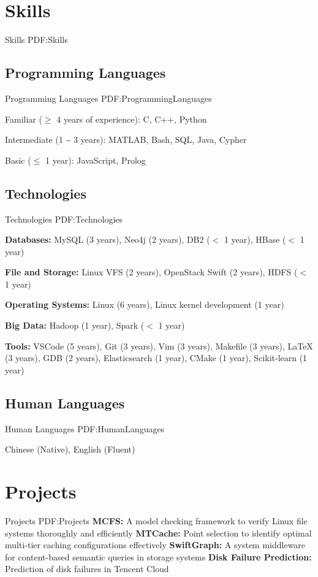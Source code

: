 \documentclass[letterpaper,10pt,oneside]{article}
\begin{document}
\begin{body}

\section
{Skills}
{Skills}
{PDF:Skills}

\subsection
{Programming Languages}
{Programming Languages}
{PDF:ProgrammingLanguages}

\BulletItem
Familiar ($\geq$ 4 years of experience): C, C++, Python

\BulletItem
Intermediate (1 {\textasciitilde} 3 years): MATLAB, Bash, SQL, Java, Cypher

\BulletItem
Basic ($\leq$ 1 year): JavaScript, Prolog


\subsection
{Technologies}
{Technologies}
{PDF:Technologies}

\BulletItem
\textbf{Databases:} MySQL (3 years), Neo4j (2 years), DB2 ($<$ 1 year), HBase ($<$ 1 year)

\BulletItem
\textbf{File and Storage:} Linux VFS (2 years), OpenStack Swift (2 years), HDFS ($<$ 1 year)

\BulletItem
\textbf{Operating Systems:} Linux (6 years), Linux kernel development (1 year)

\BulletItem
\textbf{Big Data:} Hadoop (1 year), Spark ($<$ 1 year)

\BulletItem
\textbf{Tools:} VSCode (5 years), Git (3 years), Vim (3 years), Makefile (3 years), {\LaTeX} (3 years), GDB (2 years), Elasticsearch (1 year), CMake (1 year), Scikit-learn (1 year)

\subsection
{Human Languages}
{Human Languages}
{PDF:HumanLanguages}

\BulletItem
Chinese (Native), English (Fluent)
\GapNoBreak

\section
{Projects}
{Projects}
{PDF:Projects}
\BulletItem
\textbf{MCFS: }A model checking framework to verify Linux file systems thoroughly and efficiently
\BulletItem
\textbf{MTCache: }Point selection to identify optimal multi-tier caching configurations effectively
\BulletItem
\textbf{SwiftGraph: }A system middleware for content-based semantic queries in storage systems
\BulletItem
\textbf{Disk Failure Prediction: }Prediction of disk failures in Tencent Cloud


\end{body}
\end{document}
